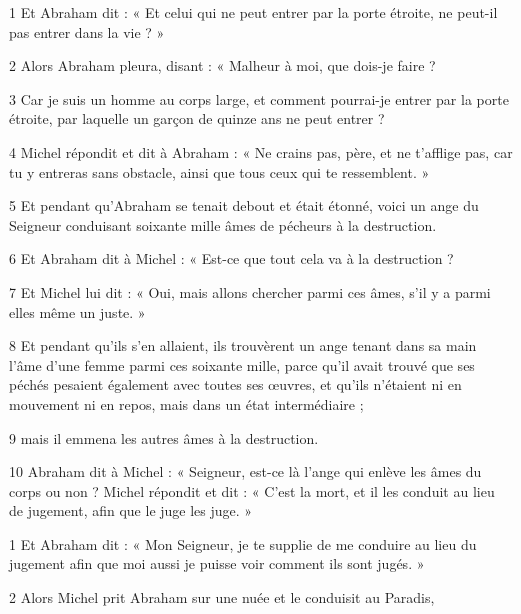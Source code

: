 \par 1 Et Abraham dit : « Et celui qui ne peut entrer par la porte étroite, ne peut-il pas entrer dans la vie ? »

\par 2 Alors Abraham pleura, disant : « Malheur à moi, que dois-je faire ?

\par 3 Car je suis un homme au corps large, et comment pourrai-je entrer par la porte étroite, par laquelle un garçon de quinze ans ne peut entrer ?

\par 4 Michel répondit et dit à Abraham : « Ne crains pas, père, et ne t'afflige pas, car tu y entreras sans obstacle, ainsi que tous ceux qui te ressemblent. »

\par 5 Et pendant qu'Abraham se tenait debout et était étonné, voici un ange du Seigneur conduisant soixante mille âmes de pécheurs à la destruction.

\par 6 Et Abraham dit à Michel : « Est-ce que tout cela va à la destruction ?

\par 7 Et Michel lui dit : « Oui, mais allons chercher parmi ces âmes, s'il y a parmi elles même un juste. »

\par 8 Et pendant qu'ils s'en allaient, ils trouvèrent un ange tenant dans sa main l'âme d'une femme parmi ces soixante mille, parce qu'il avait trouvé que ses péchés pesaient également avec toutes ses œuvres, et qu'ils n'étaient ni en mouvement ni en repos, mais dans un état intermédiaire ;

\par 9 mais il emmena les autres âmes à la destruction.

\par 10 Abraham dit à Michel : « Seigneur, est-ce là l'ange qui enlève les âmes du corps ou non ? Michel répondit et dit : « C'est la mort, et il les conduit au lieu de jugement, afin que le juge les juge. »


\par 1 Et Abraham dit : « Mon Seigneur, je te supplie de me conduire au lieu du jugement afin que moi aussi je puisse voir comment ils sont jugés. »

\par 2 Alors Michel prit Abraham sur une nuée et le conduisit au Paradis,

